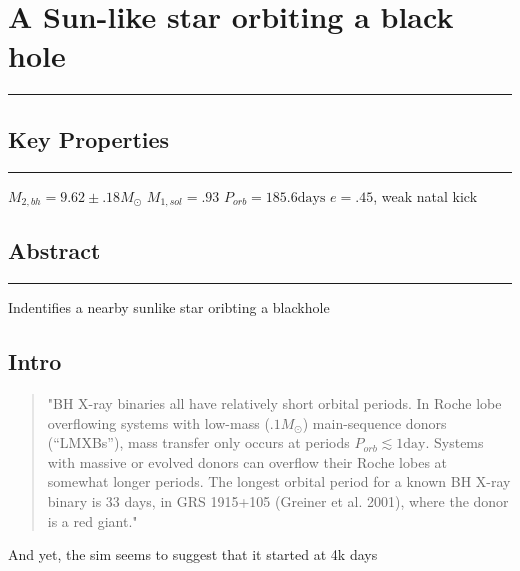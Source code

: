 \documentclass[../../mainNotes.tex]{subfiles}
\begin{document}
\fi

\pagebreak
\chapter{A Sun-like star orbiting a black hole \cite{el-badrySunlikeStarOrbiting2022}}
\hrule
\vspace{.5cm}

\section{Key Properties}
\hrule
\vspace{.5cm}

$M_{2,bh} = 9.62 \pm .18 M_\odot$
$M_{1,sol} = .93$
$P_{orb} = 185.6 \text{days}$
$e = .45$, weak natal kick
\section{Abstract}
\hrule
\vspace{.5cm}
Indentifies a nearby sunlike star oribting a blackhole

\section{Intro}

\begin{quote}
   "BH X-ray binaries all have relatively short orbital periods. In Roche lobe overflowing systems with low-mass (\(. 1 M_\odot\)) main-sequence donors (“LMXBs”), mass transfer only occurs at periods \(P_{orb} \lesssim 1 \text{day}\). Systems with massive or evolved donors can overflow their Roche lobes at somewhat longer periods. The longest orbital period for a known BH X-ray binary is 33 days, in GRS 1915+105 (Greiner et al. 2001), where the donor is a red giant."
\end{quote}

And yet, the sim seems to suggest that it started at 4k days

\ifdefined\AnMainDocument\else
\end{document}
